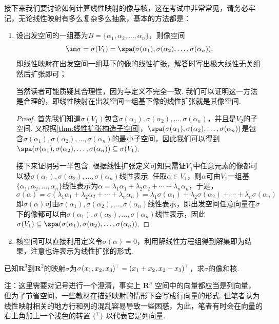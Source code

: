 接下来我们要讨论如何计算线性映射的像与核，这在考试中非常常见，请务必牢记，无论线性映射有多么复杂多么抽象，基本的方法都是：
\begin{enumerate}
    \item 设出发空间的一组基为$B=\{\alpha_1,\alpha_2,\ldots,\alpha_n\}$，则像空间
          \[\im \sigma=\sigma(V_1)=\spa(\sigma(\alpha_1),\sigma(\alpha_2),\ldots,\sigma(\alpha_n)).\]
          即线性映射在出发空间一组基下的像的线性扩张，解答时写出极大线性无关组然后扩张即可；

          当然读者可能质疑其合理性，因为与定义不完全一致. 我们可以证明这一方法是合理的，即线性映射在出发空间一组基下像的线性扩张就是其像空间.

          \begin{proof}
              首先我们知道$\sigma(V_1)$包含$\sigma(\alpha_1),\sigma(\alpha_2),\ldots,\sigma(\alpha_n)$，并且是$V_2$的子空间. 又根据\autoref{thm:线性扩张构造子空间}，$\spa(\sigma(\alpha_1),\sigma(\alpha_2),\ldots,\sigma(\alpha_n))$是包含$\sigma(\alpha_1),\sigma(\alpha_2),\ldots,\sigma(\alpha_n)$的最小子空间，因此我们可以得到$\spa(\sigma(\alpha_1),\sigma(\alpha_2),\ldots,\sigma(\alpha_n))\subseteq\sigma(V_1)$.

              接下来证明另一半包含. 根据线性扩张定义可知只需证$V_1$中任意元素的像都可以被$\sigma(\alpha_1),\sigma(\alpha_2),\ldots,\sigma(\alpha_n)$线性表示. 任取$\alpha\in V_1$，则$\alpha$可由$V_1$一组基$\{\alpha_1,\alpha_2,\ldots,\alpha_n\}$线性表示为$\alpha=\lambda_1\alpha_1+\lambda_2\alpha_2+\cdots+\lambda_n\alpha_n$，于是，
              \[\sigma(\alpha)=\sigma(\lambda_1\alpha_1+\lambda_2\alpha_2+\cdots+\lambda_n\alpha_n)=\lambda_1\sigma(\alpha_1)+\lambda_2\sigma(\alpha_2)+\cdots+\lambda_n\sigma(\alpha_n)\]
              即$\sigma(\alpha)$可由$\sigma(\alpha_1),\sigma(\alpha_2),\ldots,\sigma(\alpha_n)$线性表示，即出发空间任意向量在$\sigma$下的像都可以由$\sigma(\alpha_1),\sigma(\alpha_2),\ldots,\sigma(\alpha_n)$线性表示，因此$\sigma(V_1)\subseteq\spa(\sigma(\alpha_1),\sigma(\alpha_2),\ldots,\sigma(\alpha_n))$.
          \end{proof}

    \item 核空间可以直接利用定义令$\sigma(\alpha)=0$，利用解线性方程组得到解集即为结果，注意也许表示为线性扩张的形式.
\end{enumerate}

\begin{example}{}{}
    已知$\mathbf{R}^3$到$\mathbf{R}^2$的映射$\sigma$为$\sigma(x_1,x_2,x_3)^{\color{lightgray}\mathrm{T}}=(x_1+x_2,x_2-x_3)^{\color{lightgray}\mathrm{T}}$，求$\sigma$的像和核.
\end{example}
注：这里需要对记号进行一个澄清，事实上 $\mathbf{R}^n$ 空间中的向量都应当是列向量，但为了节省空间，一些教材在描述映射的情形下会写成行向量的形式. 但笔者认为线性映射相关的地方行和列的混乱容易导致一些困惑，为此，笔者有时会在向量的右上角加上一个浅色的转置 $({}^{\color{gray}\mathrm{T}})$ 以代表它是列向量.

